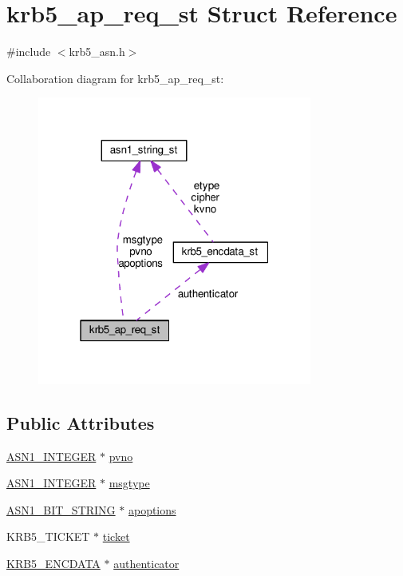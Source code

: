 \hypertarget{structkrb5__ap__req__st}{}\section{krb5\+\_\+ap\+\_\+req\+\_\+st Struct Reference}
\label{structkrb5__ap__req__st}


{\ttfamily \#include $<$krb5\+\_\+asn.\+h$>$}



Collaboration diagram for krb5\+\_\+ap\+\_\+req\+\_\+st\+:
\nopagebreak
\begin{figure}[H]
\begin{center}
\leavevmode
\includegraphics[width=256pt]{structkrb5__ap__req__st__coll__graph}
\end{center}
\end{figure}
\subsection*{Public Attributes}
\begin{DoxyCompactItemize}
\item 
\hyperlink{ossl__typ_8h_af4335399bf9774cb410a5e93de65998b}{A\+S\+N1\+\_\+\+I\+N\+T\+E\+G\+ER} $\ast$ \hyperlink{structkrb5__ap__req__st_ad7f61cf7b1d536b06dde3c71776c118f}{pvno}
\item 
\hyperlink{ossl__typ_8h_af4335399bf9774cb410a5e93de65998b}{A\+S\+N1\+\_\+\+I\+N\+T\+E\+G\+ER} $\ast$ \hyperlink{structkrb5__ap__req__st_a95993daaa70c2d6dc49746ea6867f790}{msgtype}
\item 
\hyperlink{ossl__typ_8h_af837aaa00e151b1e8773aea5a8fe1cc4}{A\+S\+N1\+\_\+\+B\+I\+T\+\_\+\+S\+T\+R\+I\+NG} $\ast$ \hyperlink{structkrb5__ap__req__st_ae43d1ed55bdd32998d4fab8918f62d6b}{apoptions}
\item 
K\+R\+B5\+\_\+\+T\+I\+C\+K\+ET $\ast$ \hyperlink{structkrb5__ap__req__st_a9f842653f3c353af99fdd723151d26a4}{ticket}
\item 
\hyperlink{krb5__asn_8h_abd8389e6748e062079450c000e20a856}{K\+R\+B5\+\_\+\+E\+N\+C\+D\+A\+TA} $\ast$ \hyperlink{structkrb5__ap__req__st_aa3f69c831c3e59add2c118ce00b974e9}{authenticator}
\end{DoxyCompactItemize}



